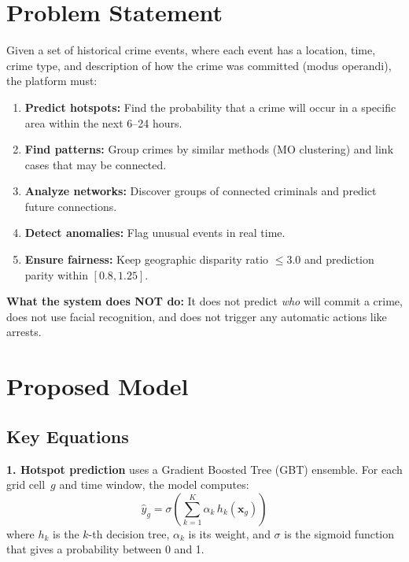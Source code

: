 \documentclass[a4paper,10pt,twocolumn]{article}
\begin{document}
\section{Problem Statement}

Given a set of historical crime events, where each event has a location, time, crime type, and description of how the crime was committed (modus operandi), the platform must:

\begin{enumerate}
  \item \textbf{Predict hotspots:} Find the probability that a crime will occur in a specific area within the next 6--24 hours.
  \item \textbf{Find patterns:} Group crimes by similar methods (MO clustering) and link cases that may be connected.
  \item \textbf{Analyze networks:} Discover groups of connected criminals and predict future connections.
  \item \textbf{Detect anomalies:} Flag unusual events in real time.
  \item \textbf{Ensure fairness:} Keep geographic disparity ratio $\leq 3.0$ and prediction parity within $[0.8, 1.25]$.
\end{enumerate}

\noindent\textbf{What the system does NOT do:} It does not predict \emph{who} will commit a crime, does not use facial recognition, and does not trigger any automatic actions like arrests.

\section{Proposed Model}

\subsection{Key Equations}

\textbf{1. Hotspot prediction} uses a Gradient Boosted Tree (GBT) ensemble. For each grid cell~$g$ and time window, the model computes:
\begin{equation}
  \hat{y}_{g} = \sigma\!\left(\sum_{k=1}^{K} \alpha_k \, h_k(\mathbf{x}_{g})\right)
  \label{eq:gbt}
\end{equation}
where $h_k$ is the $k$-th decision tree, $\alpha_k$ is its weight, and $\sigma$ is the sigmoid function that gives a probability between 0 and 1.
\end{document}
